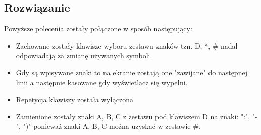 \documentclass[a4paper,12pt]{extarticle}  %
\begin{document}
\subsection{Rozwiązanie}
Powyższe polecenia zostały połączone w sposób następujący:
\begin{itemize}
    \item Zachowane zostały klawisze wyboru zestawu znaków tzn. D, *, \# nadal odpowiadają za zmianę używanych symboli.
    \item Gdy są wpisywane znaki to na ekranie zostają one "zawijane" do następnej linii a następnie kasowane gdy wyświetlacz się wypełni.
    \item Repetycja klawiszy została wyłączona
    \item Zamienione zostały znaki A, B, C z zestawu pod klawiszem D na znaki: ":", "-", ")" ponieważ znaki A, B, C można uzyskać w zestawie \#.
\end{itemize}
\clearpage

\end{document}
